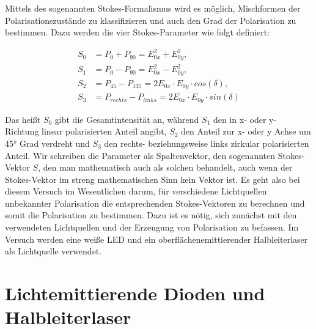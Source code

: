 \documentclass[bigchapter,colorback,accentcolor=tud4b,linedtoc,11pt]{tudreport}
\begin{document}
Mittels des sogenannten Stokes-Formalismus wird es möglich, Mischformen der Polarisationszustände zu klassifizieren und auch den Grad der Polarisation zu bestimmen. Dazu werden die vier Stokes-Parameter wie folgt definiert:

\begin{align*}
  S_0 &= P_{0} + P_{90} = E_{0x}^2 + E_{0y}^2,\\
  S_1 &= P_{0} - P_{90} = E_{0x}^2 - E_{0y}^2,\\
  S_2 &= P_{45} - P_{135} = 2E_{0x} \cdot E_{0y} \cdot cos(\delta),\\
  S_3 &= P_{rechts} - P_{links} = 2E_{0x} \cdot E_{0y} \cdot sin(\delta)
\end{align*}

Das heißt $S_0$ gibt die Gesamtintensität an, während $S_1$ den in x- oder y- Richtung linear polarisierten Anteil angibt, $S_2$ den Anteil zur x- oder y Achse um 45° Grad verdreht und $S_3$ den rechts- beziehungsweise links zirkular polarisierten Anteil. Wir schreiben die Parameter als Spaltenvektor, den sogenannten Stokes-Vektor $S$, den man mathematisch auch als solchen behandelt, auch wenn der Stokes-Vektor im streng mathematischen Sinn kein Vektor ist.
Es geht also bei diesem Versuch im Wesentlichen darum, für verschiedene Lichtquellen unbekannter Polarisation die entsprechenden Stokes-Vektoren zu berechnen und somit die Polarisation zu bestimmen. Dazu ist es nötig, sich zunächst mit den verwendeten Lichtquellen und der Erzeugung von Polarisation zu befassen. Im Versuch werden eine weiße LED und ein oberflächenemittierender Halbleiterlaser als Lichtquelle verwendet. 


\section{Lichtemittierende Dioden und Halbleiterlaser}
\end{document}
